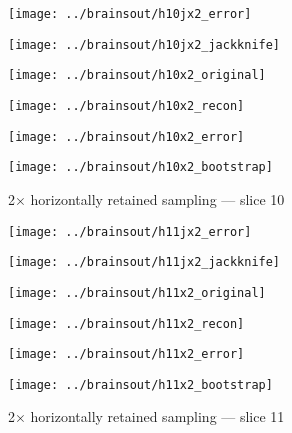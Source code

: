\documentclass[review,supplement,onefignum,onetabnum,juq]{siamonline181217}
\begin{document}
\begin{figure}
\begin{centering}

\parbox{\imsize}{\texttt{[image: ../brainsout/h10jx2\_error]}}
\parbox{\imsize}{\texttt{[image: ../brainsout/h10jx2\_jackknife]}}

\vspace{\vertsep}

\parbox{\imsize}{\texttt{[image: ../brainsout/h10x2\_original]}}
\parbox{\imsize}{\texttt{[image: ../brainsout/h10x2\_recon]}}

\vspace{\vertsep}

\parbox{\imsize}{\texttt{[image: ../brainsout/h10x2\_error]}}
\parbox{\imsize}{\texttt{[image: ../brainsout/h10x2\_bootstrap]}}

\end{centering}
\caption{2$\times$ horizontally retained sampling --- slice 10}
\end{figure}


\begin{figure}
\begin{centering}

\parbox{\imsize}{\texttt{[image: ../brainsout/h11jx2\_error]}}
\parbox{\imsize}{\texttt{[image: ../brainsout/h11jx2\_jackknife]}}

\vspace{\vertsep}

\parbox{\imsize}{\texttt{[image: ../brainsout/h11x2\_original]}}
\parbox{\imsize}{\texttt{[image: ../brainsout/h11x2\_recon]}}

\vspace{\vertsep}

\parbox{\imsize}{\texttt{[image: ../brainsout/h11x2\_error]}}
\parbox{\imsize}{\texttt{[image: ../brainsout/h11x2\_bootstrap]}}

\end{centering}
\caption{2$\times$ horizontally retained sampling --- slice 11}
\end{figure}
\end{document}
